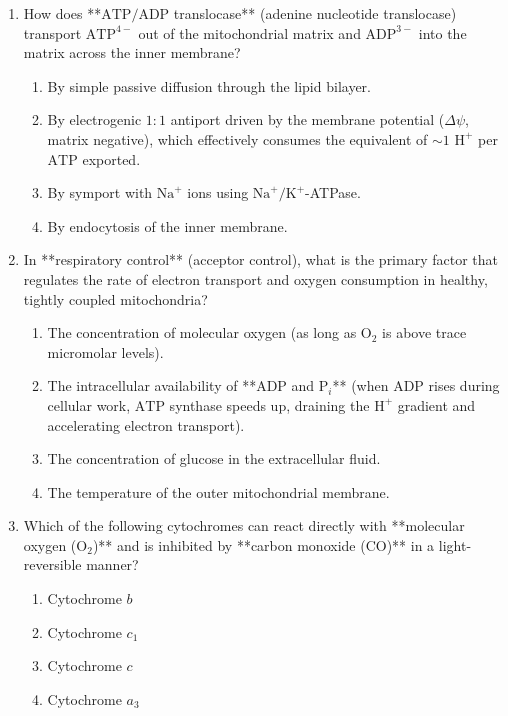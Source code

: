 \documentclass[11pt, a4paper]{article}
\begin{document}
\begin{enumerate}[label=\textbf{\arabic*.}]
\item How does **$\text{ATP}/\text{ADP}$ translocase** (adenine nucleotide translocase) transport $\text{ATP}^{4-}$ out of the mitochondrial matrix and $\text{ADP}^{3-}$ into the matrix across the inner membrane?
\begin{enumerate}[label=(\Alph*)]
    \item By simple passive diffusion through the lipid bilayer.
    \item By electrogenic $1:1$ antiport driven by the membrane potential ($\Delta \psi$, matrix negative), which effectively consumes the equivalent of $\sim 1\text{ H}^+$ per $\text{ATP}$ exported.
    \item By symport with $\text{Na}^+$ ions using $\text{Na}^+/\text{K}^+$-ATPase.
    \item By endocytosis of the inner membrane.
\end{enumerate}

\item In **respiratory control** (acceptor control), what is the primary factor that regulates the rate of electron transport and oxygen consumption in healthy, tightly coupled mitochondria?
\begin{enumerate}[label=(\Alph*)]
    \item The concentration of molecular oxygen (as long as $\text{O}_2$ is above trace micromolar levels).
    \item The intracellular availability of **$\text{ADP}$ and $\text{P}_i$** (when $\text{ADP}$ rises during cellular work, $\text{ATP}$ synthase speeds up, draining the $\text{H}^+$ gradient and accelerating electron transport).
    \item The concentration of glucose in the extracellular fluid.
    \item The temperature of the outer mitochondrial membrane.
\end{enumerate}

\item Which of the following cytochromes can react directly with **molecular oxygen ($\text{O}_2$)** and is inhibited by **carbon monoxide ($\text{CO}$)** in a light-reversible manner?
\begin{enumerate}[label=(\Alph*)]
    \item Cytochrome $b$
    \item Cytochrome $c_1$
    \item Cytochrome $c$
    \item Cytochrome $a_3$
\end{enumerate}


\end{enumerate}
\end{document}
